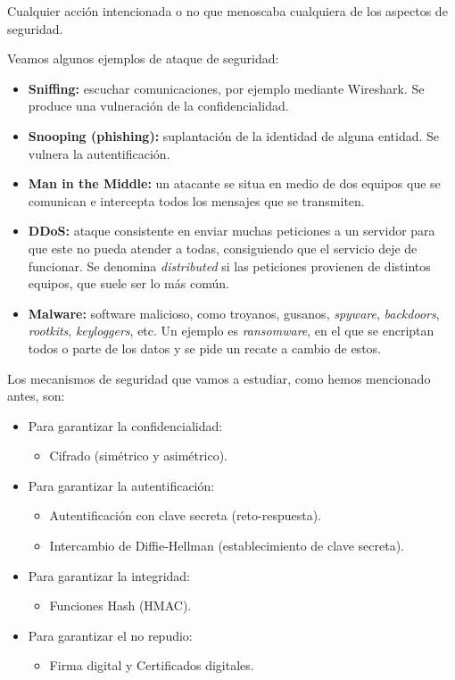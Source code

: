 \begin{definicion}
    Cualquier acción intencionada o no que menoscaba cualquiera de los aspectos de seguridad. 
\end{definicion}

Veamos algunos ejemplos de ataque de seguridad:
\begin{itemize}
    \item \textbf{Sniffing:} escuchar comunicaciones, por ejemplo mediante Wireshark. Se produce una vulneración de la confidencialidad.
    \item \textbf{Snooping (phishing):} suplantación de la identidad de alguna entidad. Se vulnera la autentificación.
    \item \textbf{Man in the Middle:} un atacante se situa en medio de dos equipos que se comunican e intercepta todos los mensajes que se transmiten.
    \item \textbf{\acrfull{DDoS}:} ataque consistente en enviar muchas peticiones a un servidor para que este no pueda atender a todas, consiguiendo que el servicio deje de funcionar. Se denomina \emph{distributed} si las peticiones provienen de distintos equipos, que suele ser lo más común. 
    \item \textbf{Malware:} software malicioso, como troyanos, gusanos, \textit{spyware}, \textit{backdoors}, \textit{rootkits}, \textit{keyloggers}, etc. Un ejemplo es \textit{ransomware}, en el que se encriptan todos o parte de los datos y se pide un recate a cambio de estos.
\end{itemize}


Los mecanismos de seguridad que vamos a estudiar, como hemos mencionado antes, son:
\begin{itemize}
    \item Para garantizar la confidencialidad:
    \begin{itemize}
        \item Cifrado (simétrico y asimétrico).
    \end{itemize}
    \item Para garantizar la autentificación:
    \begin{itemize}
        \item Autentificación con clave secreta (reto-respuesta).
        \item Intercambio de Diffie-Hellman (establecimiento de clave secreta).
    \end{itemize}

    \item Para garantizar la integridad:
    \begin{itemize}
        \item Funciones Hash (\acrfull{HMAC}).
    \end{itemize}

    \item Para garantizar el no repudio:
    \begin{itemize}
        \item Firma digital y Certificados digitales.
    \end{itemize}
\end{itemize}

